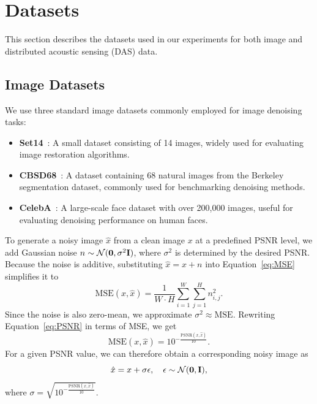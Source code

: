 
\section{Datasets}

This section describes the datasets used in our experiments for both image and distributed acoustic sensing (DAS) data.

\subsection{Image Datasets}

We use three standard image datasets commonly employed for image denoising tasks:
\begin{itemize}
    \item \textbf{Set14}~\cite{Set14}: A small dataset consisting of 14 images, widely used for evaluating image restoration algorithms.
    \item \textbf{CBSD68}~\cite{CBSD68}: A dataset containing 68 natural images from the Berkeley segmentation dataset, commonly used for benchmarking denoising methods.
    \item \textbf{CelebA}~\cite{CelebA}: A large-scale face dataset with over 200,000 images, useful for evaluating denoising performance on human faces.
\end{itemize}

To generate a noisy image $\hat{x}$ from a clean image $x$ at a predefined PSNR level, we add Gaussian noise $n \sim \normal$, where $\sigma^2$ is determined by the desired PSNR\@.
Because the noise is additive, substituting $\hat{x} = x + n$ into Equation~\ref{eq:MSE} simplifies it to
\begin{equation}
    \text{MSE}(x,\hat{x}) = \frac{1}{W \cdot H} \sum_{i=1}^{W} \sum_{j=1}^{H} n_{i,j}^2.
\end{equation}
Since the noise is also zero-mean, we approximate $\sigma^2 \approx \text{MSE}$.
Rewriting Equation~\ref{eq:PSNR} in terms of MSE, we get
\begin{equation}
    \text{MSE}(x,\hat{x}) = 10^{-\frac{\text{PSNR}(x,\hat{x})}{10}}.
\end{equation}
For a given PSNR value, we can therefore obtain a corresponding noisy image as
\begin{equation}
    \hat{x} = x + \sigma\epsilon, \quad \epsilon \sim \mathcal{N}(\mathbf{0},\mathbf{I}),
\end{equation}
where $\sigma = \sqrt{10^{-\frac{\text{PSNR}(x,\hat{x})}{10}}}$.

